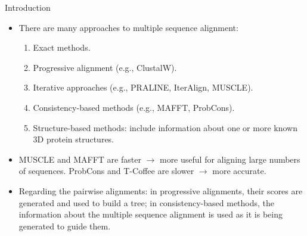 \begin{frame}{Introduction}

    \begin{itemize}    
        \item There are many approaches to multiple sequence alignment:
        \begin{enumerate}
            \item Exact methods.
            \item Progressive alignment (e.g., ClustalW).
            \item Iterative approaches (e.g., PRALINE, IterAlign, MUSCLE).
            \item Consistency-based methods (e.g., MAFFT, ProbCons).
            \item Structure-based methods: include information about one or more known 3D protein structures.
        \end{enumerate}
        \item MUSCLE and MAFFT are faster $\rightarrow$ more useful for aligning large numbers of sequences. ProbCons and T-Coffee are slower $\rightarrow$ more accurate.
        \item Regarding the pairwise alignments: in progressive alignments, their scores are generated and used to build a tree; in consistency-based methods, the information about the multiple sequence alignment is used as it is being generated to guide them.
    \end{itemize}
    
\end{frame}

